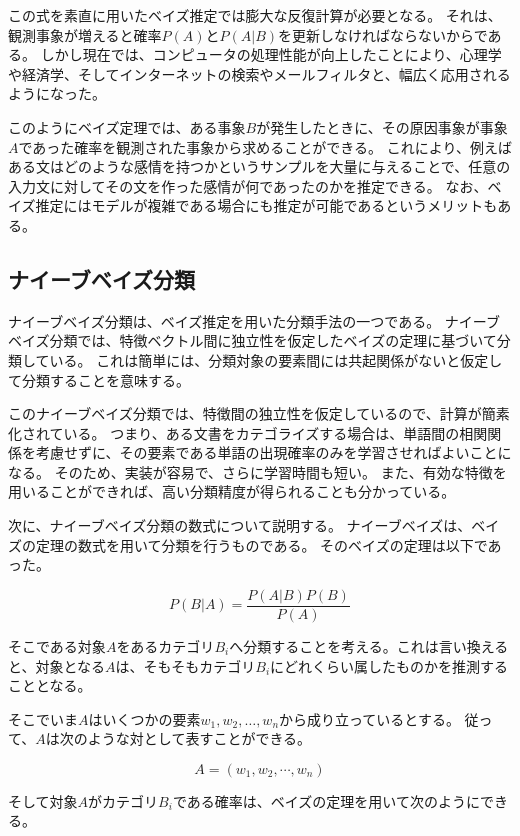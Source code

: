 \documentclass[11pt,a4j]{jsarticle}
\begin{document}
この式を素直に用いたベイズ推定では膨大な反復計算が必要となる。
それは、観測事象が増えると確率$P(A)$と$P(A|B)$を更新しなければならないからである。
しかし現在では、コンピュータの処理性能が向上したことにより、心理学や経済学、そしてインターネットの検索やメールフィルタと、幅広く応用されるようになった。

このようにベイズ定理では、ある事象$B$が発生したときに、その原因事象が事象$A$であった確率を観測された事象から求めることができる。
これにより、例えばある文はどのような感情を持つかというサンプルを大量に与えることで、任意の入力文に対してその文を作った感情が何であったのかを推定できる。
なお、ベイズ推定にはモデルが複雑である場合にも推定が可能であるというメリットもある。

 \subsection{ナイーブベイズ分類}\label{sec:defnaivebayes}
ナイーブベイズ分類は、ベイズ推定を用いた分類手法の一つである。
ナイーブベイズ分類では、特徴ベクトル間に独立性を仮定したベイズの定理に基づいて分類している。
これは簡単には、分類対象の要素間には共起関係がないと仮定して分類することを意味する。

このナイーブベイズ分類では、特徴間の独立性を仮定しているので、計算が簡素化されている。
つまり、ある文書をカテゴライズする場合は、単語間の相関関係を考慮せずに、その要素である単語の出現確率のみを学習させればよいことになる。
そのため、実装が容易で、さらに学習時間も短い。
また、有効な特徴を用いることができれば、高い分類精度が得られることも分かっている。

次に、ナイーブベイズ分類の数式について説明する。
ナイーブベイズは、ベイズの定理の数式を用いて分類を行うものである。
そのベイズの定理は以下であった。

\begin{equation}
  P(B|A)=\frac{P(A|B)P(B)}{P(A)}
  \label{eq:nb}
\end{equation}

そこである対象$A$をあるカテゴリ$B_i$へ分類することを考える。これは言い換えると、対象となる$A$は、そもそもカテゴリ$B_i$にどれくらい属したものかを推測することとなる。

そこでいま$A$はいくつかの要素$w_1, w_2, \ldots, w_n$から成り立っているとする。
従って、$A$は次のような対として表すことができる。

\begin{equation}
  A = (w_1, w_2, \cdots ,w_n)
\end{equation}

そして対象$A$がカテゴリ$B_i$である確率は、ベイズの定理を用いて次のようにできる。
\end{document}
